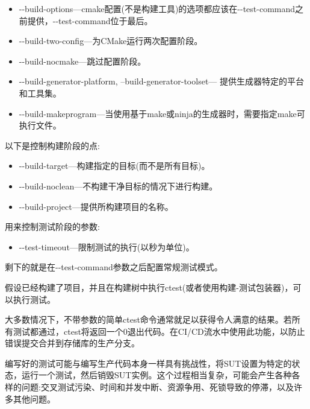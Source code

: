 \begin{itemize}
\item 
-{}-build-options—cmake配置(不是构建工具)的选项都应该在-{}-test-command之前提供，-{}-test-command位于最后。

\item 
-{}-build-two-config—为CMake运行两次配置阶段。

\item 
-{}-build-nocmake—跳过配置阶段。

\item 
-{}-build-generator-platform, --build-generator-toolset— 提供生成器特定的平台和工具集。

\item 
-{}-build-makeprogram—当使用基于make或ninja的生成器时，需要指定make可执行文件。
\end{itemize}

以下是控制构建阶段的点:

\begin{itemize}
\item 
-{}-build-target—构建指定的目标(而不是所有目标)。
	
\item 
-{}-build-noclean—不构建干净目标的情况下进行构建。
	
\item 
-{}-build-project—提供所构建项目的名称。
\end{itemize}

用来控制测试阶段的参数:

\begin{itemize}
\item 
-{}-test-timeout—限制测试的执行(以秒为单位)。
\end{itemize}

剩下的就是在-{}-test-command参数之后配置常规测试模式。


假设已经构建了项目，并且在构建树中执行ctest(或者使用构建-测试包装器)，可以执行测试。

大多数情况下，不带参数的简单ctest命令通常就足以获得令人满意的结果。若所有测试都通过，ctest将返回一个0退出代码。在CI/CD流水中使用此功能，以防止错误提交合并到存储库的生产分支。

编写好的测试可能与编写生产代码本身一样具有挑战性，将SUT设置为特定的状态，运行一个测试，然后销毁SUT实例。这个过程相当复杂，可能会产生各种各样的问题:交叉测试污染、时间和并发中断、资源争用、死锁导致的停滞，以及许多其他问题。

